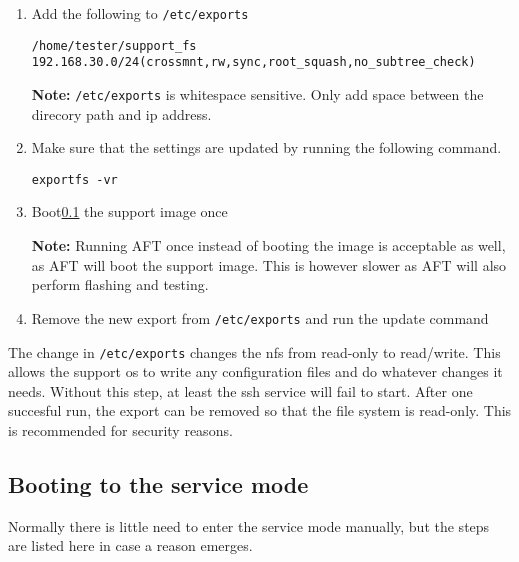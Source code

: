 \documentclass[a4paper,11pt]{article}
\newcommand{\note}{\textbf{Note: }}
\newcommand{\cmd}[1]{\texttt{#1}}
\begin{document}
\begin{enumerate}
\item Add the following to \cmd{/etc/exports}

\begin{lstlisting}
/home/tester/support_fs 192.168.30.0/24(crossmnt,rw,sync,root_squash,no_subtree_check) 
\end{lstlisting}

\note \cmd{/etc/exports} is whitespace sensitive. Only add space between the direcory path and ip address.

\item Make sure that the settings are updated by running the following command.

\begin{lstlisting}
exportfs -vr
\end{lstlisting}

\item Boot\ref{bbbboot} the support image once

\note Running AFT once instead of booting the image is acceptable as well, as AFT will boot the support image. This is however slower as AFT will also perform flashing and testing.

\item Remove the new export from \cmd{/etc/exports} and run the update command

\end{enumerate}


The change in \cmd{/etc/exports} changes the nfs from read-only to read/write. This allows the support os to write any configuration files and do whatever changes it needs. Without this step, at least the ssh service will fail to start. After one succesful run, the export can be removed so that the file system is read-only. This is recommended for security reasons.

\subsection{Booting to the service mode}
\label{bbbboot}

Normally there is little need to enter the service mode manually, but the steps are listed here in case a reason emerges.
\end{document}
